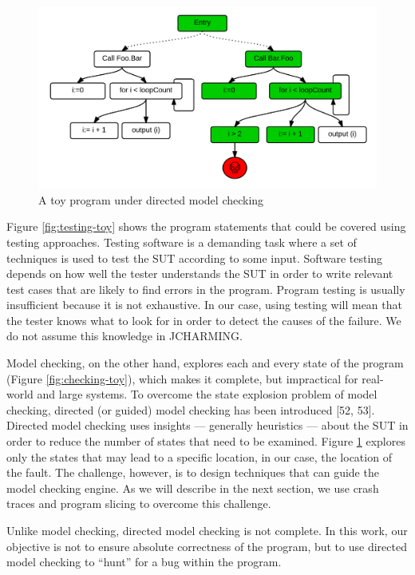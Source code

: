 \documentclass[12pt]{report}
\begin{document}
\begin{figure}
  \centering
    \includegraphics[scale=0.8]{media/chap8/dmc.png}
    \caption{A toy program under directed model checking
    \label{fig:dchecking-toy}}
\end{figure}

Figure \ref{fig:testing-toy} shows the program statements that could be
covered using testing approaches. Testing software is a demanding task
where a set of techniques is used to test the SUT according to some
input. Software testing depends on how well the tester understands the
SUT in order to write relevant test cases that are likely to find errors
in the program. Program testing is usually insufficient because it is
not exhaustive. In our case, using testing will mean that the tester
knows what to look for in order to detect the causes of the failure. We
do not assume this knowledge in JCHARMING.

Model checking, on the other hand, explores each and every state of the
program (Figure \ref{fig:checking-toy}), which makes it complete, but
impractical for real-world and large systems. To overcome the state
explosion problem of model checking, directed (or guided) model checking
has been introduced {[}52, 53{]}. Directed model checking uses insights
--- generally heuristics --- about the SUT in order to reduce the number
of states that need to be examined. Figure \ref{fig:dchecking-toy}
explores only the states that may lead to a specific location, in our
case, the location of the fault. The challenge, however, is to design
techniques that can guide the model checking engine. As we will describe
in the next section, we use crash traces and program slicing to overcome
this challenge.

Unlike model checking, directed model checking is not complete. In this
work, our objective is not to ensure absolute correctness of the
program, but to use directed model checking to ``hunt'' for a bug within
the program.
\end{document}
